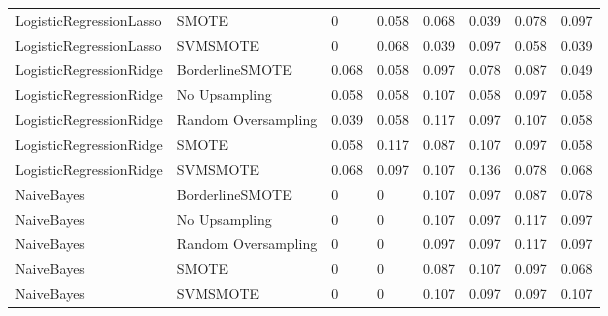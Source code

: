 \begin{tabular}{llllllll}
     LogisticRegressionLasso &               SMOTE &     0 &                     0.058 &                 0.068 &                  0.039 &                                   0.078 &    0.097 \\
     LogisticRegressionLasso &            SVMSMOTE &     0 &                     0.068 &                 0.039 &                  0.097 &                                   0.058 &    0.039 \\
     LogisticRegressionRidge &     BorderlineSMOTE & 0.068 &                     0.058 &                 0.097 &                  0.078 &                                   0.087 &    0.049 \\
     LogisticRegressionRidge &       No Upsampling & 0.058 &                     0.058 &                 0.107 &                  0.058 &                                   0.097 &    0.058 \\
     LogisticRegressionRidge & Random Oversampling & 0.039 &                     0.058 &                 0.117 &                  0.097 &                                   0.107 &    0.058 \\
     LogisticRegressionRidge &               SMOTE & 0.058 &                     0.117 &                 0.087 &                  0.107 &                                   0.097 &    0.058 \\
     LogisticRegressionRidge &            SVMSMOTE & 0.068 &                     0.097 &                 0.107 &                  0.136 &                                   0.078 &    0.068 \\
                  NaiveBayes &     BorderlineSMOTE &     0 &                         0 &                 0.107 &                  0.097 &                                   0.087 &    0.078 \\
                  NaiveBayes &       No Upsampling &     0 &                         0 &                 0.107 &                  0.097 &                                   0.117 &    0.097 \\
                  NaiveBayes & Random Oversampling &     0 &                         0 &                 0.097 &                  0.097 &                                   0.117 &    0.097 \\
                  NaiveBayes &               SMOTE &     0 &                         0 &                 0.087 &                  0.107 &                                   0.097 &    0.068 \\
                  NaiveBayes &            SVMSMOTE &     0 &                         0 &                 0.107 &                  0.097 &                                   0.097 &    0.107 \\

\end{tabular}

